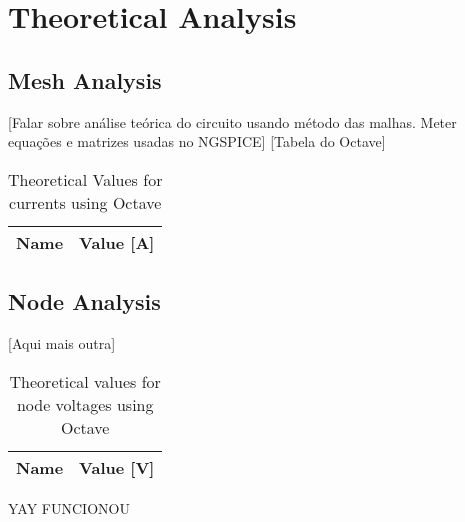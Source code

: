 \section{Theoretical Analysis}
\label{sec:analysis}

\subsection{Mesh Analysis}
[Falar sobre análise teórica do circuito usando método das malhas. Meter equações e matrizes usadas no NGSPICE]
[Tabela do Octave]

\begin{table}[H]
  \centering
  \begin{tabular}{|l|r|}
    \hline
    {\bf Name} & {\bf Value [A]} \\ \hline
    
  \end{tabular}
  \caption{Theoretical Values for currents using Octave}
  \label{tab:TCurrents}
\end{table}

\subsection{Node Analysis}
[Aqui mais outra]

\begin{table}[H]
  \centering
  \begin{tabular}{|l|r|}
    \hline
    {\bf Name} & {\bf Value [V]} \\ \hline
    
  \end{tabular}
  \caption{Theoretical values for node voltages using Octave}
  \label{tab:TVoltages}
\end{table}

YAY FUNCIONOU
